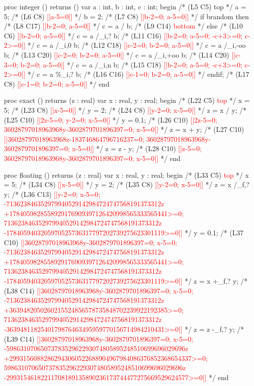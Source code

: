 \documentclass[a4paper,11pt]{article}
\newenvironment{prog}
{\begin{example}\color{prog}}
{\end{example}\par}
\begin{document}
{
\begin{prog}\footnotesize
proc integer () returns () var a : int, b : int, c : int;
begin
  /* (L5 C5) top */
  a = 5; /* (L6 C8) \textcolor{red}{[|a-5=0|]} */
  b = 2; /* (L7 C8) \textcolor{red}{[|b-2=0; a-5=0|]} */
  if brandom then
     /* (L8 C17) \textcolor{red}{[|b-2=0; a-5=0|]} */
     c = a / b; /* (L9 C14) \textcolor{red}{bottom} */
  else
    /* (L10 C6) \textcolor{red}{[|b-2=0; a-5=0|]} */
    c = a /_i,? b; /* (L11 C16) \textcolor{red}{[|b-2=0; a-5=0; -c+3>=0; c-2>=0|]} */
    c = a /_i,0 b; /* (L12 C18) \textcolor{red}{[|c-2=0; b-2=0; a-5=0|]} */
    c = a /_i,-oo b; /* (L13 C20) \textcolor{red}{[|c-2=0; b-2=0; a-5=0|]} */
    c = a /_i,+oo b; /* (L14 C20) \textcolor{red}{[|c-3=0; b-2=0; a-5=0|]} */
    c = a /_i,n b; /* (L15 C18) \textcolor{red}{[|b-2=0; a-5=0; -c+3>=0; c-2>=0|]} */
    c = a \%_i,? b; /* (L16 C16) \textcolor{red}{[|c-1=0; b-2=0; a-5=0|]} */
  endif; /* (L17 C8) \textcolor{red}{[|c-1=0; b-2=0; a-5=0|]} */
end

proc exact () returns (z : real) var x : real, y : real;
begin
  /* (L22 C5) \textcolor{red}{top} */
  x = 5; /* (L23 C8) \textcolor{red}{[|x-5=0|]} */
  y = 2; /* (L24 C8) \textcolor{red}{[|y-2=0; x-5=0|]} */
  z = x / y; /* (L25 C10) \textcolor{red}{[|2z-5=0; y-2=0; x-5=0|]} */
  y = 0.1; /* (L26 C10)
	      \textcolor{red}{[|2z-5=0; 36028797018963968y-3602879701896397=0; x-5=0|]} */
  z = x + y; /* (L27 C10)
		\textcolor{red}{[|36028797018963968z-183746864796716237=0;
		  36028797018963968y-3602879701896397=0; x-5=0|]} */
  z = z - y; /* (L28 C10)
		\textcolor{red}{[|z-5=0; 36028797018963968y-3602879701896397=0; x-5=0|]} */
end

proc floating () returns (z : real) var x : real, y : real;
begin
  /* (L33 C5) \textcolor{red}{top} */
  x = 5; /* (L34 C8) \textcolor{red}{[|x-5=0|]} */
  y = 2; /* (L35 C8) \textcolor{red}{[|y-2=0; x-5=0|]} */
  z = x /_f,? y; /* (L36 C13)
		    \textcolor{red}{[|y-2=0; x-5=0;
		      -713623846352979940529142984724747568191373312z
		      +1784059828558929176909397126420998565333565441>=0;
		      713623846352979940529142984724747568191373312z
		      -1784059403205970525736317797202739275623301119>=0|]} */
  y = 0.1; /* (L37 C10)
	      \textcolor{red}{[|36028797018963968y-3602879701896397=0; x-5=0;
		-713623846352979940529142984724747568191373312z
		+1784059828558929176909397126420998565333565441>=0;
		713623846352979940529142984724747568191373312z
		-1784059403205970525736317797202739275623301119>=0|]} */
  z = x +_f,? y; /* (L38 C14)
		    \textcolor{red}{[|36028797018963968y-3602879701896397=0; x-5=0;
		      -713623846352979940529142984724747568191373312z
		      +3639482050260215524856578735848702239922192385>=0;
		      713623846352979940529142984724747568191373312z
		      -3639481182540179876463495959770156714984210431>=0|]} */
  z = z -_f,? y; /* (L39 C14)
		    \textcolor{red}{[|36028797018963968y-3602879701896397=0; x-5=0;
		      -5986310706507378352962293074805895248510699696029696z
		      +29931560882862943060522688904967984086376852368654337>=0;
		      5986310706507378352962293074805895248510699696029696z
		      -29931546182211708189135890236173744477275669529624577>=0|]} */
end


\end{prog}}
\end{document}
